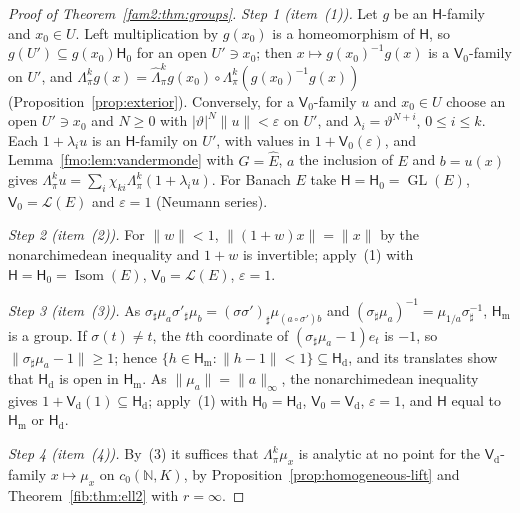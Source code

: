 \documentclass[11pt]{amsart}
\theoremstyle{definition}
\theoremstyle{remark}
\numberwithin{equation}{section}
\newcommand{\N}{\mathbb N}
\newcommand{\cL}{\mathcal L}
\newcommand{\abs}[1]{\lvert #1\rvert}
\newcommand{\norm}[1]{\lVert #1\rVert}
\theoremstyle{plain}
\theoremstyle{definition}
\theoremstyle{plain}
\newcommand{\hLambda}{\widehat\Lambda}
\begin{document}
\begin{proof}[Proof of Theorem~\ref{fam2:thm:groups}]
\emph{Step 1 (item~(1)).} Let $g$ be an $\mathsf H$-family and $x_0\in U$. Left multiplication by $g(x_0)$ is a
homeomorphism of $\mathsf H$, so $g(U')\subseteq g(x_0)\mathsf H_0$ for an open $U'\ni x_0$; then
$x\mapsto g(x_0)^{-1}g(x)$ is a $\mathsf V_0$-family on $U'$, and $\Lambda^k_\pi g(x)=\hLambda^k_\pi g(x_0)\circ
\Lambda^k_\pi(g(x_0)^{-1}g(x))$ (Proposition~\ref{prop:exterior}). Conversely, for a $\mathsf V_0$-family $u$ and $x_0\in U$
choose an open $U'\ni x_0$ and $N\ge0$ with $\abs\vartheta^N\norm u<\varepsilon$ on $U'$, and $\lambda_i=\vartheta^{N+i}$,
$0\le i\le k$. Each $1+\lambda_iu$ is an $\mathsf H$-family on $U'$, with values in $1+\mathsf V_0(\varepsilon)$, and
Lemma~\ref{fmo:lem:vandermonde} with $G=\widehat E$, $a$ the inclusion of $E$ and $b=u(x)$ gives
$\Lambda^k_\pi u=\sum_i\chi_{ki}\Lambda^k_\pi(1+\lambda_iu)$. For Banach $E$ take $\mathsf H=\mathsf H_0=\operatorname{GL}(E)$,
$\mathsf V_0=\cL(E)$ and $\varepsilon=1$ (Neumann series).

\emph{Step 2 (item~(2)).} For $\norm w<1$, $\norm{(1+w)x}=\norm x$ by the nonarchimedean inequality and $1+w$ is
invertible; apply~(1) with $\mathsf H=\mathsf H_0=\operatorname{Isom}(E)$, $\mathsf V_0=\cL(E)$, $\varepsilon=1$.

\emph{Step 3 (item~(3)).} As $\sigma_\sharp\mu_a\sigma'_\sharp\mu_b=(\sigma\sigma')_\sharp\mu_{(a\circ\sigma')b}$ and
$(\sigma_\sharp\mu_a)^{-1}=\mu_{1/a}\sigma^{-1}_\sharp$, $\mathsf H_{\mathrm m}$ is a group. If $\sigma(t)\ne t$, the $t$th
coordinate of $(\sigma_\sharp\mu_a-1)e_t$ is $-1$, so $\norm{\sigma_\sharp\mu_a-1}\ge1$; hence $\{h\in\mathsf H_{\mathrm m}:
\norm{h-1}<1\}\subseteq\mathsf H_{\mathrm d}$, and its translates show that $\mathsf H_{\mathrm d}$ is open in
$\mathsf H_{\mathrm m}$. As $\norm{\mu_a}=\norm a_\infty$, the nonarchimedean inequality gives $1+\mathsf V_{\mathrm d}(1)
\subseteq\mathsf H_{\mathrm d}$; apply~(1) with $\mathsf H_0=\mathsf H_{\mathrm d}$, $\mathsf V_0=\mathsf V_{\mathrm d}$,
$\varepsilon=1$, and $\mathsf H$ equal to $\mathsf H_{\mathrm m}$ or $\mathsf H_{\mathrm d}$.

\emph{Step 4 (item~(4)).} By~(3) it suffices that $\Lambda^k_\pi\mu_x$ is analytic at no point for the
$\mathsf V_{\mathrm d}$-family $x\mapsto\mu_x$ on $c_0(\N,K)$, by Proposition~\ref{prop:homogeneous-lift} and
Theorem~\ref{fib:thm:ell2} with $r=\infty$.
\end{proof}
\end{document}
